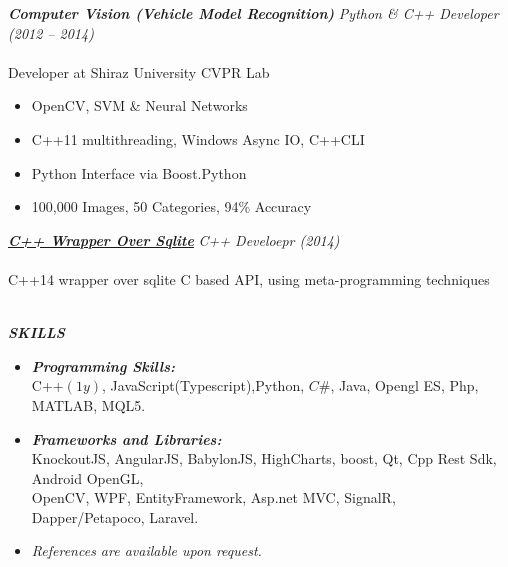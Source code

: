 \documentclass{article}
\newcommand{\hh}[1]{\large{\textit{\textbf{#1}}}}
\newcommand{\hhh}[1]{\Large{\textit{\textbf{#1}}}}
\newcommand{\h}[1]{\normalsize{\textit{\textbf{#1}}}}
\renewcommand{\i}[1]{\normalsize{\textit{#1}}}
\begin{document}
\hh{Computer Vision (Vehicle Model Recognition)} \hfill \i{Python \& C++ Developer (2012 -- 2014)} \\ \vspace{-.35cm} \\
Developer at Shiraz University CVPR Lab \\ \vspace{-.9cm}
\begin{itemize}
 \setlength{\itemsep}{1pt} \setlength{\parskip}{0pt} \setlength{\parsep}{0pt}
 \item OpenCV, SVM \& Neural Networks
 \item C++11 multithreading, Windows Async IO, C++\/CLI
 \item Python Interface via Boost.Python
 \item 100,000 Images, 50 Categories, 94\% Accuracy
\end{itemize}

\hh{\href{https://github.com/aminroosta/sqlite_modern_cpp}{C++ Wrapper Over Sqlite}}
\hfill \i{C++ Develoepr (2014)} \\ \vspace {-.35cm} \\
C++14 wrapper over sqlite C based API, using meta-programming techniques \\ \vspace{-.35cm} \\

\vspace{.1cm}
 \centerline{\hhh{SKILLS}}
\vspace{-.6cm}
\begin{itemize}
 \setlength{\itemsep}{3pt} \setlength{\parskip}{0pt} \setlength{\parsep}{0pt}
 \item \h{Programming Skills:} \\
 C++$(1y)$, JavaScript(Typescript),Python, $C\#$, Java, Opengl ES,  Php, MATLAB, MQL5.
 \item \h{Frameworks and Libraries:} \\
 KnockoutJS, AngularJS, BabylonJS, HighCharts, boost, Qt, Cpp Rest Sdk, Android OpenGL, \\
 OpenCV, WPF, EntityFramework, Asp.net MVC, SignalR, Dapper/Petapoco, Laravel.
\end{itemize}

\begin{itemize}
 \item \textit{References are available upon request.}
\end{itemize}
\end{document}

